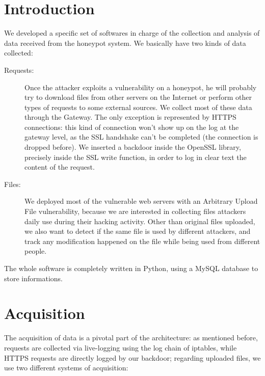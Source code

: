 \section{Introduction}

We developed a specific set of softwares in charge of the collection and analysis of data received from the honeypot system.
We basically have two kinds of data collected:
\begin{description}
\item[Requests: ] Once the attacker exploits a vulnerability on a honeypot, he will probably try to download files from other servers on the Internet or perform other types of requests to some external sources. We collect most of these data through the Gateway. The only exception is represented by HTTPS connections: this kind of connection won't show up on the log at the gateway level, as the SSL handshake can't be completed (the connection is dropped before). We inserted a backdoor inside the OpenSSL library, precisely inside the SSL write function, in order to log in clear text the content of the request.

\item[Files: ] We deployed most of the vulnerable web servers with an Arbitrary Upload File vulnerability, because we are interested in collecting files attackers daily use during their hacking activity. Other than original files uploaded, we also want to detect if the same file is used by different attackers, and track any modification happened on the file while being used from different people.
\end{description}

The whole software is completely written in Python, using a MySQL database to store informations.

\section{Acquisition}

The acquisition of data is a pivotal part of the architecture: as mentioned before, requests are collected via live-logging using the log chain of iptables, while HTTPS requests are directly logged by our backdoor; regarding uploaded files, we use two different systems of acquisition:

